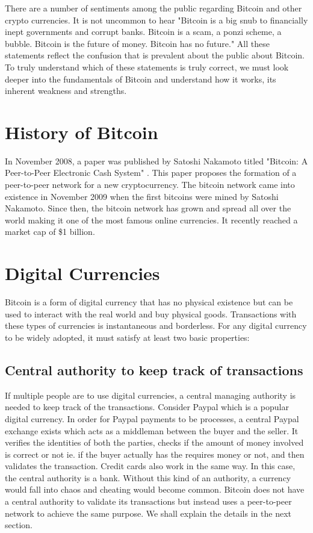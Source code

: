 


There are a number of sentiments among the public regarding Bitcoin and other crypto currencies. It is not uncommon to hear "Bitcoin is a big snub to financially inept governments and corrupt banks. Bitcoin is a scam, a ponzi scheme, a bubble. Bitcoin is the future of money. Bitcoin has no future." All these statements reflect the confusion that is prevalent about the public about Bitcoin. To truly understand which of these statements is truly correct, we must look deeper into the fundamentals of Bitcoin and understand how it works, its inherent weakness and strengths. 

\section{History of Bitcoin}
In November 2008, a paper was published by Satoshi Nakamoto titled "Bitcoin: A Peer-to-Peer Electronic Cash System" \cite{nakamoto}. This paper proposes the formation of a peer-to-peer network for a new cryptocurrency. The bitcoin network came into existence in November 2009 when the first bitcoins were mined by Satoshi Nakamoto. Since then, the bitcoin network has grown and spread all over the world making it one of the most famous online currencies. It recently reached a market cap of \$1 billion. 

\section{Digital Currencies}
Bitcoin is a form of digital currency that has no physical existence but can be used to interact with the real world and buy physical goods. Transactions with these types of currencies is instantaneous and borderless. For any digital currency to be widely adopted, it must satisfy at least two basic properties:

\subsection{Central authority to keep track of transactions}
If multiple people are to use digital currencies, a central managing authority is needed to keep track of the transactions. Consider Paypal which is a popular digital currency. In order for Paypal payments to be processes, a central Paypal exchange exists which acts as a middleman between the buyer and the seller. It verifies the identities of both the parties, checks if the amount of money involved is correct or not ie. if the buyer actually has the requires money or not, and then validates the transaction. Credit cards also work in the same way. In this case, the central authority is a bank. Without this kind of an authority, a currency would fall into chaos and cheating would become common. Bitcoin does not have a central authority to validate its transactions but instead uses a peer-to-peer network to achieve the same purpose. We shall explain the details in the next section. 

